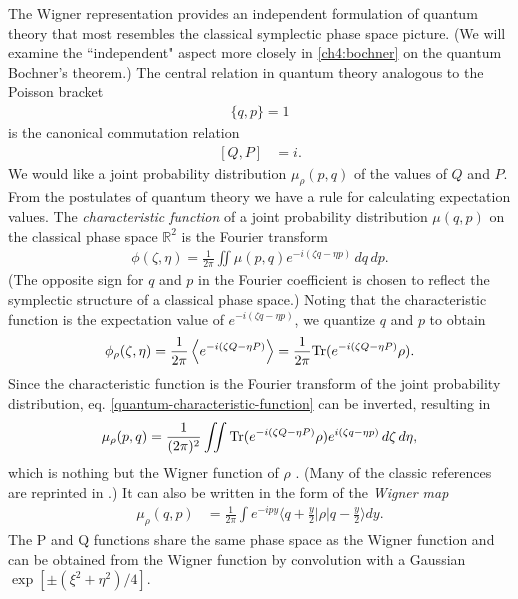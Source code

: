 The Wigner representation provides an independent formulation of quantum theory that most resembles the classical symplectic phase space picture. (We will examine the ``independent" aspect more closely in \autoref{ch4:bochner} on the quantum Bochner's theorem.)
The central relation in quantum theory analogous to the Poisson bracket
\begin{align}\label{canonical-Poisson-bracket}
\{ q,p \} = 1
\end{align}
is the canonical commutation relation
\begin{align}\label{CCR}
[Q,P] &= i.
\end{align}
We would like a joint probability distribution $\mu_{\rho}(p,q)$ of the values of $Q$ and $P$. From the postulates of quantum theory we have a rule for calculating expectation values. The \emph{characteristic function} of a joint probability distribution $\mu(q,p)$ on the classical phase space $\mathbb{R}^2$ is the Fourier transform
\begin{align}\label{characteristic-function}
\phi(\zeta,\eta) = \frac{1}{2\pi} \iint \mu(p,q) e^{-i(\zeta q -\eta p)}\,dq\,dp.
\end{align}
(The opposite sign for $q$ and $p$ in the Fourier coefficient is chosen to reflect the symplectic structure of a classical phase space.)  Noting that the characteristic function is the expectation value of $e^{-i(\zeta q-\eta p)}$, we quantize $q$ and $p$ to obtain
\begin{align}\label{quantum-characteristic-function}
\phi_\rho(\zeta,\eta) =  \frac{1}{2\pi} \av{e^{ -i(\zeta Q-\eta P)}} = \frac{1}{2\pi}\Tr( e^{ -i(\zeta Q-\eta P)} \rho).
\end{align}
Since the characteristic function is the Fourier transform of the joint probability distribution, eq. \ref{quantum-characteristic-function} can be inverted, resulting in
\begin{align}\label{def-wigner'}
\mu_\rho(p,q)=\frac{1}{(2\pi)^2}\iint \Tr(e^{-i(\zeta Q-\eta P)}\rho) e^{i (\zeta q -\eta p)}\,d\zeta\,d\eta,
\end{align}
which is nothing but the Wigner function of $\rho$ \cite{weyl_quantenmechanik_1927, wigner_quantum_1932, groenewold_principles_1946, moyal_quantum_1949}. (Many of the classic references are reprinted in \cite{zachos2005quantum}.) It can also be written in the form of the \emph{Wigner map}
\begin{align}
\mu_{\rho}(q,p) &= \frac{1}{2\pi} \int e^{-ipy} \bigg\langle q+\frac{y}{2} \bigg| \rho \bigg|q-\frac{y}{2}\bigg\rangle dy.
\end{align}
The P and Q functions share the same phase space as the Wigner function and can be obtained from the Wigner function by convolution with a Gaussian $\exp[\pm (\xi^2 + \eta^2)/4]$.

